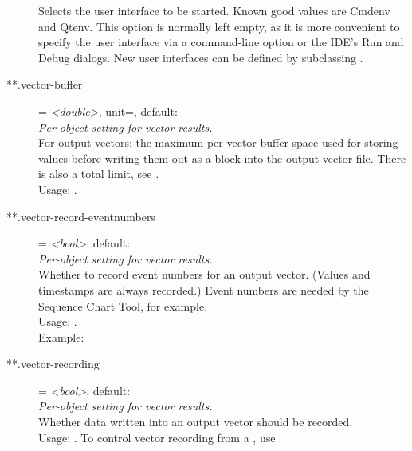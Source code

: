 \begin{description}
    Selects the user interface to be started. Known good values are Cmdenv and
    Qtenv. This option is normally left empty, as it is more convenient to
    specify the user interface via a command-line option or the IDE's Run and
    Debug dialogs. New user interfaces can be defined by subclassing
    .
\item[**.vector-buffer] = \textit{<double>}, unit=, default: \\
    \textit{Per-object setting for vector results.}\\
    For output vectors: the maximum per-vector buffer space used for storing
    values before writing them out as a block into the output vector file.
    There is also a total limit, see
    .\\
    Usage:
    .
\item[**.vector-record-eventnumbers] = \textit{<bool>}, default: \\
    \textit{Per-object setting for vector results.}\\
    Whether to record event numbers for an output vector. (Values and
    timestamps are always recorded.) Event numbers are needed by the Sequence
    Chart Tool, for example.\\
    Usage:
    .\\
    Example:
\item[**.vector-recording] = \textit{<bool>}, default: \\
    \textit{Per-object setting for vector results.}\\
    Whether data written into an output vector should be recorded.\\
    Usage:
    .
    To control vector recording from a , use
\end{description}
